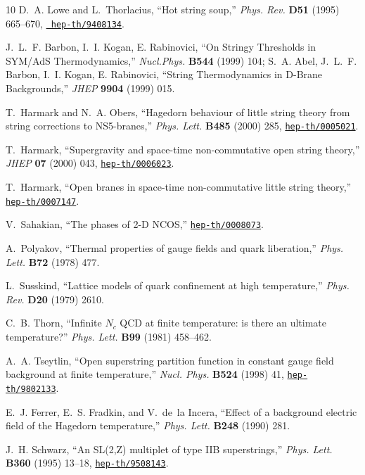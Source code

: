 \begin{thebibliography}{10}
D.~A. Lowe and L.~Thorlacius, ``Hot string soup,'' {\em Phys. Rev.} {\bf D51}
  (1995) 665--670, \href{http://xxx.lanl.gov/abs/hep-th/9408134}{{\tt
  hep-th/9408134}}.

 J.~L.~F. Barbon, I.~I. Kogan, E. Rabinovici,
``On Stringy Thresholds in SYM/AdS Thermodynamics,''
{\em Nucl.Phys.} {\bf B544} (1999) 104;
S.~A. Abel, J.~L.~F. Barbon, I.~I. Kogan, E. Rabinovici,
``String Thermodynamics in D-Brane Backgrounds,''
{\em JHEP} {\bf 9904} (1999) 015.


T.~Harmark and N.~A. Obers, ``Hagedorn behaviour of little string theory from
  string corrections to NS5-branes,'' {\em Phys. Lett.} {\bf B485} (2000) 285,
  \href{http://xxx.lanl.gov/abs/hep-th/0005021}{{\tt hep-th/0005021}}.

T.~Harmark, ``Supergravity and space-time non-commutative open string theory,''
  {\em JHEP} {\bf 07} (2000) 043,
  \href{http://xxx.lanl.gov/abs/hep-th/0006023}{{\tt hep-th/0006023}}.

T.~Harmark, ``Open branes in space-time non-commutative little string theory,''
  \href{http://xxx.lanl.gov/abs/hep-th/0007147}{{\tt hep-th/0007147}}.

V.~Sahakian, ``The phases of 2-D NCOS,''
  \href{http://xxx.lanl.gov/abs/hep-th/0008073}{{\tt hep-th/0008073}}.

A.~Polyakov, ``Thermal properties of gauge fields and quark liberation,''
  {\em Phys. Lett.} {\bf B72} (1978) 477.

L.~Susskind, ``Lattice models of quark confinement at high temperature,''
  {\em Phys. Rev.} {\bf D20} (1979) 2610.

C.~B. Thorn, ``Infinite $N_c$ QCD at finite temperature: is there an
  ultimate temperature?'' {\em Phys. Lett.} {\bf B99} (1981) 458--462.

A.~A. Tseytlin, ``Open superstring partition function in constant gauge field
  background at finite temperature,'' {\em Nucl. Phys.} {\bf B524} (1998) 41,
  \href{http://xxx.lanl.gov/abs/hep-th/9802133}{{\tt hep-th/9802133}}.

E.~J. Ferrer, E.~S. Fradkin, and V.~de~la Incera, ``Effect of a background
  electric field of the Hagedorn temperature,'' 
  {\em Phys. Lett.} {\bf B248} (1990) 281.

J.~H. Schwarz, ``An SL(2,Z) multiplet of type IIB superstrings,'' {\em Phys.
  Lett.} {\bf B360} (1995) 13--18,
  \href{http://xxx.lanl.gov/abs/hep-th/9508143}{{\tt hep-th/9508143}}.


\end{thebibliography}
